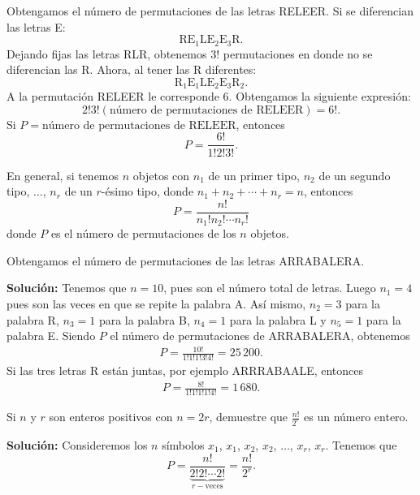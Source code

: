 \newpage

\begin{myexample}
    Obtengamos el número de permutaciones de las letras RELEER. Si se diferencian las letras E:
    $$\text{RE}_1\text{LE}_2\text{E}_3\text{R}.$$
    Dejando fijas las letras RLR, obtenemos $3!$ permutaciones en donde no se diferencian las R. Ahora, al tener las R diferentes:
    $$\text{R}_1\text{E}_1\text{LE}_2\text{E}_3\text{R}_2.$$
    A la permutación RELEER le corresponde 6. Obtengamos la siguiente expresión:
    $$2!3!(\text{número de permutaciones de RELEER}) = 6!.$$
    Si $P = \text{número de permutaciones de RELEER}$, entonces
    $$P = \frac{6!}{1!2!3!}.$$
\end{myexample}

\begin{BOX}
    En general, si tenemos $n$ objetos con $n_1$ de un primer tipo, $n_2$ de un segundo tipo, $\dots$, $n_r$ de un $r$-ésimo tipo, donde $n_1 + n_2 + \cdots + n_r = n$, entonces
    $$P = \frac{n!}{n_1!n_2! \cdots n_r!}$$
    donde $P$ es el número de permutaciones de los $n$ objetos.
\end{BOX}

\begin{myexample}
    Obtengamos el número de permutaciones de las letras ARRABALERA.

    \tcblower
    \textbf{\color{jblueleft}Solución:} Tenemos que $n = 10$, pues son el número total de letras. Luego $n_1 = 4$ pues son las veces en que se repite la palabra A. Así mismo, $n_2 = 3$ para la palabra R, $n_3 = 1$ para la palabra B, $n_4 = 1$ para la palabra L y $n_5 = 1$ para la palabra E.
    Siendo $P$ el número de permutaciones de ARRABALERA, obtenemos
    \begin{align*}
        P = \frac{10!}{1!1!1!3!4!} = 25 \, 200.
    \end{align*}
    Si las tres letras R están juntas, por ejemplo ARRRABAALE, entonces
    \begin{align*}
        P = \frac{8!}{1!1!1!1!4!} = 1 \, 680.
    \end{align*}
\end{myexample}

\begin{myexample}
    Si $n$ y $r$ son enteros positivos con $n = 2r$, demuestre que $\displaystyle \frac{n!}{2^r}$ es un número entero.

    \tcblower
    \textbf{\color{jblueleft}Solución:} Consideremos los $n$ símbolos $x_1$, $x_1$, $x_2$, $x_2$, $\dots$, $x_r$, $x_r$. Tenemos que
    $$P = \frac{n!}{\underbrace{2!2! \cdots 2!}_{r-\text{veces}}} = \frac{n!}{2^r}.$$
\end{myexample}

